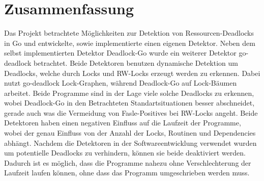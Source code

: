\chapter{Zusammenfassung}
Das Projekt betrachtete Möglichkeiten zur Detektion von Ressourcen-Deadlocks
in Go und entwickelte, sowie implementierte einen eigenen Detektor. Neben dem 
selbst implementierten Detektor Deadlock-Go wurde ein weiterer Detektor go-deadlock
betrachtet. Beide Detektoren benutzen dynamische Detektion um Deadlocks, welche 
durch Locks und RW-Locks erzeugt werden zu erkennen. Dabei nutzt go-deadlock 
Lock-Graphen, während Deadlock-Go auf Lock-Bäumen arbeitet. Beide Programme sind 
in der Lage viele solche Deadlocks zu erkennen, wobei Deadlock-Go in den 
Betrachteten Standartsituationen besser abschneidet, gerade auch was die
Vermeidung von Fasle-Positives bei RW-Locks angeht. Beide Detektoren 
haben einen negativen Einfluss auf die Laufzeit der Programme, wobei der 
genau Einfluss von der Anzahl der Locks, Routinen und Dependencies abhängt.
Nachdem die Detektoren in der Softwareentwicklung verwendet wurden um potentielle 
Deadlocks zu verhindern, können sie beide deaktiviert werden. Dadurch ist es 
möglich, dass die Programme nahezu ohne Verschlechterung der Laufzeit laufen 
können, ohne dass das Programm umgeschrieben werden muss.